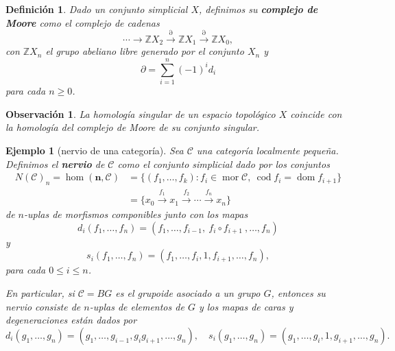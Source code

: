 \documentclass[11pt]{report}
\theoremstyle{colored}
\newtheorem{definition}{Definición}[section]
\newtheorem{remark}{Observación}[section]
\newtheorem{example}{Ejemplo}[section]
\newcommand{\Z}{\mathbb{Z}}
\begin{document}
\begin{definition} Dado un conjunto simplicial $X$, definimos su \textbf{complejo de Moore} como el complejo de cadenas
\[
\cdots \to \Z X_2 \xrightarrow{\partial} \Z X_1 \xrightarrow{\partial} \Z X_0,
\]
con $\Z X_n$ el grupo abeliano libre generado por el conjunto $X_n$ y 
\[
\partial = \sum_{i=1}^n(-1)^i d_i
\]
para cada $n \geq 0$.
\end{definition}

\begin{remark} La homología singular de un espacio topológico $X$ coincide con la homología del complejo de Moore de su conjunto singular.
\end{remark}

\begin{example}[nervio de una categoría] Sea $\mathscr{C}$ una categoría localmente pequeña. Definimos el \textbf{nervio} de  $\mathscr{C}$ como el conjunto simplicial dado por los conjuntos
\begin{align*}
N(\mathscr{C})_n = \hom(\mathbf{n},\mathscr{C}) &= \{(f_1,\dots, f_k) : f_i \in \operatorname{mor} \mathscr{C}, \ \operatorname{cod} f_i = \operatorname{dom}f_{i+1}\}\\
& = \{x_0 \xrightarrow{f_1} x_1 \xrightarrow{f_2} \cdots \xrightarrow{f_n} x_n\}
\end{align*}
de $n$-uplas de morfismos componibles junto con los mapas 
\[
d_i(f_1, \dots, f_n) = (f_1, \dots,f_{i-1}, \ f_i \circ f_{i+1} \ ,\dots,f_n)
\]
y
\[
s_i(f_1, \dots, f_n) = (f_1, \dots, f_i, 1, f_{i+1},\dots,f_n),
\]
para cada $0 \leq i \leq n$. 

En particular, si $\mathscr{C} = BG$ es el grupoide asociado a un grupo $G$, entonces su nervio consiste de $n$-uplas de elementos de $G$ y los mapas de caras y degeneraciones están dados por
\[
d_i(g_1, \dots, g_n) = (g_1,\dots, g_{i-1},g_ig_{i+1},\dots,g_n), \quad s_i(g_1, \dots,g_n) = (g_1, \dots,g_i,1,g_{i+1},\dots,g_n).
\]
\end{example}
\end{document}
